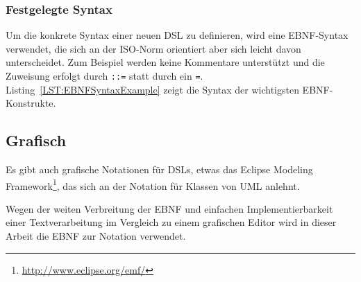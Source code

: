 \documentclass[../InterneDSLs.tex]{subfiles}
\begin{document}
\subsubsection{Festgelegte Syntax}
Um die konkrete Syntax einer neuen DSL zu definieren, wird eine EBNF-Syntax verwendet, die sich an der ISO-Norm orientiert aber sich leicht davon unterscheidet. Zum Beispiel werden keine Kommentare unterstützt und die Zuweisung erfolgt durch \verb|::=| statt durch ein \verb|=|. Listing~\ref{LST:EBNFSyntaxExample} zeigt die Syntax der wichtigsten EBNF-Konstrukte.
\begin{figure}[ht]

\end{figure}


\subsection{Grafisch}
Es gibt auch grafische Notationen für DSLs, etwas das Eclipse Modeling Framework\footnote{\url{http://www.eclipse.org/emf/}}, das sich an der Notation für Klassen von UML anlehnt.

Wegen der weiten Verbreitung der EBNF und einfachen Implementierbarkeit einer Textverarbeitung im Vergleich zu einem grafischen Editor wird in dieser Arbeit die EBNF zur Notation verwendet.
\end{document}
